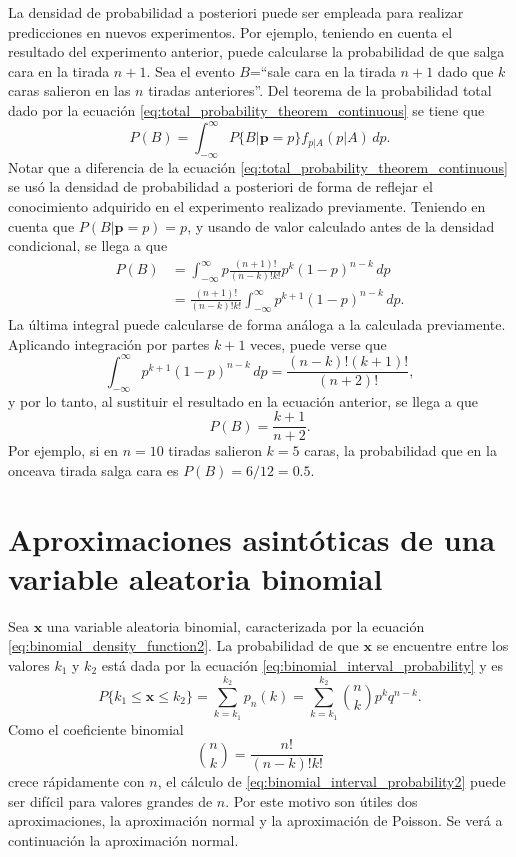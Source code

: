 \documentclass[a4paper]{report}
\newcommand{\x}{\mathbf{x}}
\newcommand{\p}{\mathbf{p}}
\begin{document}
La densidad de probabilidad a posteriori puede ser empleada para realizar predicciones en nuevos experimentos. Por ejemplo, teniendo en cuenta el resultado del experimento anterior, puede calcularse la probabilidad de que salga cara en la tirada \(n+1\). Sea el evento \(B\)=``sale cara en la tirada \(n+1\) dado que \(k\) caras salieron en las \(n\) tiradas anteriores''. Del teorema de la probabilidad total dado por la ecuación \ref{eq:total_probability_theorem_continuous} se tiene que
\[
 P(B)=\int_{-\infty}^{\infty}P\{B|\p = p\}f_{p|A}(p|A)\,dp.
\]
Notar que a diferencia de la ecuación \ref{eq:total_probability_theorem_continuous} se usó la densidad de probabilidad a posteriori de forma de reflejar el conocimiento adquirido en el experimento realizado previamente. Teniendo en cuenta que \(P(B|\p=p)=p\), y usando de valor calculado antes de la densidad condicional, se llega a que
\begin{align*}
 P(B)&=\int_{-\infty}^{\infty}p\frac{(n+1)!}{(n-k)!k!}p^k(1-p)^{n-k}\,dp\\
     &=\frac{(n+1)!}{(n-k)!k!}\int_{-\infty}^{\infty}p^{k+1}(1-p)^{n-k}\,dp.
\end{align*}
La última integral puede calcularse de forma análoga a la calculada previamente. Aplicando integración por partes \(k+1\) veces, puede verse que
\[
 \int_{-\infty}^{\infty}p^{k+1}(1-p)^{n-k}\,dp=\frac{(n-k)!(k+1)!}{(n+2)!},
\]
y por lo tanto, al sustituir el resultado en la ecuación anterior, se llega a que
\[
 P(B)=\frac{k+1}{n+2}.
\]
Por ejemplo, si en \(n=10\) tiradas salieron \(k=5\) caras, la probabilidad que en la onceava tirada salga cara es \(P(B)=6/12=0.5\).


\section{Aproximaciones asintóticas de una variable aleatoria binomial}

Sea \(\x\) una variable aleatoria binomial, caracterizada por la ecuación  \ref{eq:binomial_density_function2}. La probabilidad de que \(\x\) se encuentre entre los valores \(k_1\) y \(k_2\) está dada por la ecuación \ref{eq:binomial_interval_probability} y es
\begin{equation}\label{eq:binomial_interval_probability2}
 P\{k_1\leq\x\leq k_2\}=\sum_{k=k_1}^{k_2}p_n(k)=\sum_{k=k_1}^{k_2}\binom{n}{k}p^kq^{n-k}.
\end{equation}
Como el coeficiente binomial
\[
 \binom{n}{k}=\frac{n!}{(n-k)!k!}
\]
crece rápidamente con \(n\), el cálculo de \ref{eq:binomial_interval_probability2} puede ser difícil para valores grandes de \(n\). Por este motivo son útiles dos aproximaciones, la aproximación normal y la aproximación de Poisson. Se verá a continuación la aproximación normal.
\end{document}
